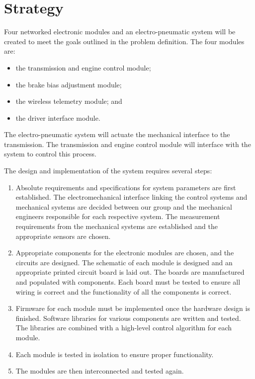 \section{Strategy \label{sec:intro_strategy}}

Four networked electronic modules and an electro-pneumatic system will be created to meet the goals outlined in the problem definition. The four modules are:

\begin{itemize}
\item the transmission and engine control module;
\item the brake bias adjustment module;
\item the wireless telemetry module; and
\item the driver interface module.
\end{itemize}

The electro-pneumatic system will actuate the mechanical interface to the transmission. The transmission and engine control module will interface with the system to control this process.

The design and implementation of the system requires several steps:

\begin{enumerate}

\item Absolute requirements and specifications for system parameters are first established. The electromechanical interface linking the control systems and mechanical systems are decided between our group and the mechanical engineers responsible for each respective system. The measurement requirements from the mechanical systems are established and the appropriate sensors are chosen.

\item Appropriate components for the electronic modules are chosen, and the circuits are designed. The schematic of each module is designed and an appropriate printed circuit board is laid out. The boards are manufactured and populated with components. Each board must be tested to ensure all wiring is correct and the functionality of all the components is correct.

\item Firmware for each module must be implemented once the hardware design is finished. Software libraries for various components are written and tested. The libraries are combined with a high-level control algorithm for each module.
 
\item Each module is tested in isolation to ensure proper functionality. 

\item The modules are then interconnected and tested again.

\end{enumerate}

